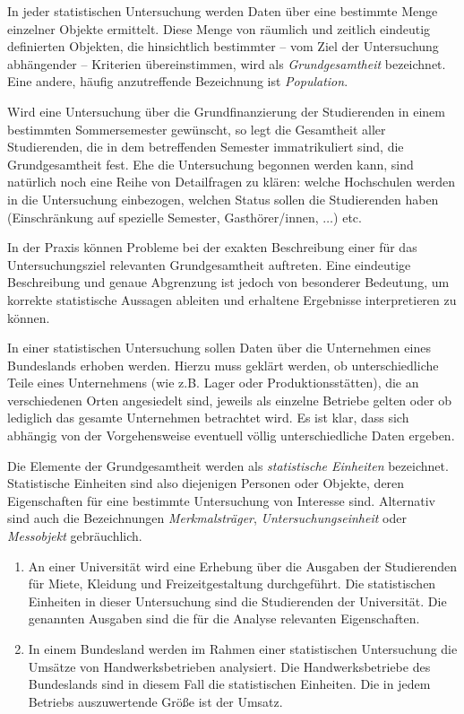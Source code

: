 \documentclass{lecture}
\begin{document}
    In jeder statistischen Untersuchung werden Daten über eine bestimmte Menge einzelner Objekte ermittelt.
    Diese Menge von räumlich und zeitlich eindeutig definierten Objekten, die hinsichtlich bestimmter -- vom Ziel der Untersuchung abhängender -- Kriterien übereinstimmen, wird als \emph{Grundgesamtheit} bezeichnet.
    Eine andere, häufig anzutreffende Bezeichnung ist \emph{Population}.
    \begin{example}
        Wird eine Untersuchung über die Grundfinanzierung der Studierenden in einem bestimmten Sommersemester gewünscht, so legt die Gesamtheit aller Studierenden, die in dem betreffenden Semester immatrikuliert sind, die Grundgesamtheit fest.
        Ehe die Untersuchung begonnen werden kann, sind natürlich noch eine Reihe von Detailfragen zu klären:
        welche Hochschulen werden in die Untersuchung einbezogen, welchen Status sollen die Studierenden haben (Einschränkung auf spezielle Semester, Gasthörer/innen, \(\ldots\)) etc.
    \end{example}
    In der Praxis können Probleme bei der exakten Beschreibung einer für das Untersuchungsziel relevanten Grundgesamtheit auftreten.
    Eine eindeutige Beschreibung und genaue Abgrenzung ist jedoch von besonderer Bedeutung, um korrekte statistische Aussagen ableiten und erhaltene Ergebnisse interpretieren zu können.
    \begin{example}
        In einer statistischen Untersuchung sollen Daten über die Unternehmen eines Bundeslands erhoben werden.
        Hierzu muss geklärt werden, ob unterschiedliche Teile eines Unternehmens (wie z.B. Lager oder Produktionsstätten), die an verschiedenen Orten angesiedelt sind, jeweils als einzelne Betriebe gelten oder ob lediglich das gesamte Unternehmen betrachtet wird.
        Es ist klar, dass sich abhängig von der Vorgehensweise eventuell völlig unterschiedliche Daten ergeben.
    \end{example}
    Die Elemente der Grundgesamtheit werden als \emph{statistische Einheiten} bezeichnet.
    Statistische Einheiten sind also diejenigen Personen oder Objekte, deren Eigenschaften für eine bestimmte Untersuchung von Interesse sind.
    Alternativ sind auch die Bezeichnungen \emph{Merkmalsträger}, \emph{Untersuchungseinheit} oder \emph{Messobjekt} gebräuchlich.
    \begin{example}
        \begin{enumerate}
            \item An einer Universität wird eine Erhebung über die Ausgaben der Studierenden für Miete, Kleidung und Freizeitgestaltung durchgeführt.
            Die statistischen Einheiten in dieser Untersuchung sind die Studierenden der Universität.
            Die genannten Ausgaben sind die für die Analyse relevanten Eigenschaften.
            \item In einem Bundesland werden im Rahmen einer statistischen Untersuchung die Umsätze von Handwerksbetrieben analysiert.
            Die Handwerksbetriebe des Bundeslands sind in diesem Fall die statistischen Einheiten.
            Die in jedem Betriebs auszuwertende Größe ist der Umsatz.
        \end{enumerate}
    \end{example}
\end{document}
